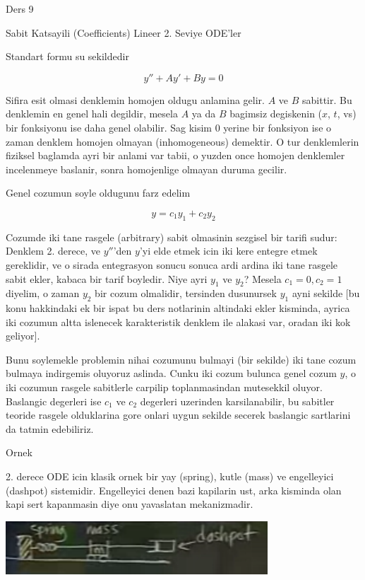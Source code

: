 \documentclass[12pt,fleqn]{article}
\begin{document}
Ders 9

Sabit Katsayili (Coefficients) Lineer 2. Seviye ODE'ler 

Standart formu su sekildedir

\[ y'' + Ay' + By = 0 \]

Sifira esit olmasi denklemin homojen oldugu anlamina gelir. $A$ ve $B$
sabittir. Bu denklemin en genel hali degildir, mesela $A$ ya da $B$
bagimsiz degiskenin ($x$, $t$, vs) bir fonksiyonu ise daha genel
olabilir. Sag kisim 0 yerine bir fonksiyon ise o zaman denklem homojen
olmayan (inhomogeneous) demektir. O tur denklemlerin fiziksel baglamda ayri
bir anlami var tabii, o yuzden once homojen denklemler incelenmeye
baslanir, sonra homojenlige olmayan duruma gecilir.

Genel cozumun soyle oldugunu farz edelim

\[ y = c_1 y_1 + c_2 y_2 \]

Cozumde iki tane rasgele (arbitrary) sabit olmasinin sezgisel bir tarifi
sudur: Denklem 2. derece, ve $y''$'den $y$'yi elde etmek icin iki kere
entegre etmek gereklidir, ve o sirada entegrasyon sonucu sonuca ardi ardina
iki tane rasgele sabit ekler, kabaca bir tarif boyledir. Niye ayri $y_1$ ve
$y_2$?  Mesela $c_1 = 0, c_2 = 1$ diyelim, o zaman $y_2$ bir cozum
olmalidir, tersinden dusunursek $y_1$ ayni sekilde [bu konu hakkindaki ek
bir ispat bu ders notlarinin altindaki ekler kisminda, ayrica iki cozumun
altta islenecek karakteristik denklem ile alakasi var, oradan iki kok
geliyor].

Bunu soylemekle problemin nihai cozumunu bulmayi (bir sekilde) iki tane
cozum bulmaya indirgemis oluyoruz aslinda. Cunku iki cozum bulunca genel
cozum $y$, o iki cozumun rasgele sabitlerle carpilip toplanmasindan
mutesekkil oluyor. Baslangic degerleri ise $c_1$ ve $c_2$ degerleri
uzerinden karsilanabilir, bu sabitler teoride rasgele olduklarina gore
onlari uygun sekilde secerek baslangic sartlarini da tatmin edebiliriz. 

Ornek

2. derece ODE icin klasik ornek bir yay (spring), kutle (mass) ve
engelleyici (dashpot) sistemidir. Engelleyici denen bazi kapilarin ust,
arka kisminda olan kapi sert kapanmasin diye onu yavaslatan mekanizmadir.

\includegraphics[height=2cm]{9_1.png}
\end{document}
